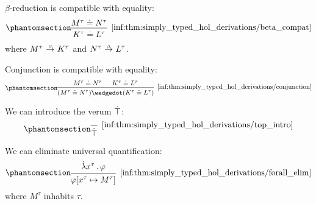 \begin{proposition}
\begin{thmenum}[series=thm:simply_typed_hol_derivations]
     \( \beta \)-reduction is compatible with equality:
    \begin{equation*}\taglabel[\ensuremath{ \logic{HOL}_{=\beta} }]{inf:thm:simply_typed_hol_derivations/beta_compat}
      \begin{prooftree}
        \hypo{ M^\tau \syneq N^\tau }
        \infer1[\ref{inf:thm:simply_typed_hol_derivations/beta_compat}]{ K^\tau \syneq L^\tau },
      \end{prooftree}
    \end{equation*}
    where \( M^\tau \bred K^\tau \) and \( N^\tau \bred L^\tau \).

     Conjunction is compatible with equality:
    \begin{equation*}\taglabel[\ensuremath{ \logic{HOL}_{=\wedge} }]{inf:thm:simply_typed_hol_derivations/conjunction}
      \begin{prooftree}
        \hypo{ M^\tau \syneq N^\tau }
        \hypo{ K^\tau \syneq L^\tau }
        \infer2[\ref{inf:thm:simply_typed_hol_derivations/conjunction}]{ (M^\tau \syneq N^\tau) \synwedge (K^\tau \syneq L^\tau) }
      \end{prooftree}
    \end{equation*}

     We can introduce the verum \( \dot{\top} \):
    \begin{equation*}\taglabel[\ensuremath{ \logic{HOL}_{\top+} }]{inf:thm:simply_typed_hol_derivations/top_intro}
      \begin{prooftree}
        \infer0[\ref{inf:thm:simply_typed_hol_derivations/top_intro}]{ \syntop },
      \end{prooftree}
    \end{equation*}

     We can eliminate universal quantification:
    \begin{equation*}\taglabel[\ensuremath{ \logic{HOL}_{\forall-} }]{inf:thm:simply_typed_hol_derivations/forall_elim}
      \begin{prooftree}
        \hypo{ \qabs {x^\tau} \varphi }
        \infer1[\ref{inf:thm:simply_typed_hol_derivations/forall_elim}]{ \varphi[x^\tau \mapsto M^\tau] },
      \end{prooftree}
    \end{equation*}
    where \( M^\tau \) inhabits \( \tau \).


\end{thmenum}
\end{proposition}

